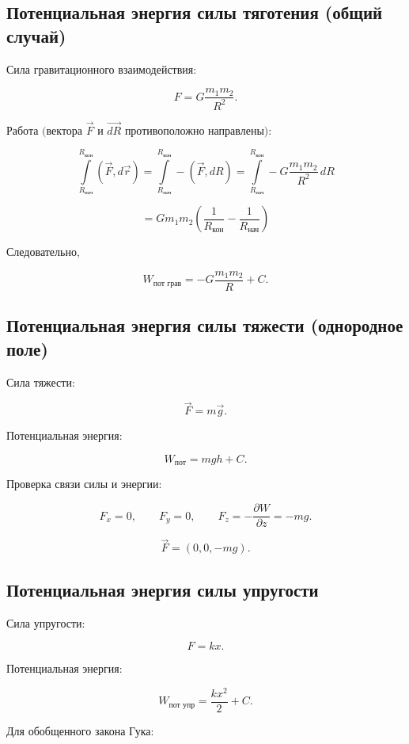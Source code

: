\documentclass[a4paper,12pt]{article}
\begin{document}
\subsection*{Потенциальная энергия силы тяготения (общий случай)}

Сила гравитационного взаимодействия:

\[
F = G \frac{m_1 m_2}{R^2}.
\]

$\text{Работа (вектора } \vec{F} \text{ и } \vec{dR} \text{ противоположно направлены):}$

\[
\int\limits_{R_{\text{нач}}}^{R_{\text{кон}}} (\vec F, d\vec r)
=
\int\limits_{R_{\text{нач}}}^{R_{\text{кон}}} - (\vec F, dR)
=
\int\limits_{R_{\text{нач}}}^{R_{\text{кон}}} - G \frac{m_1 m_2}{R^2}\, dR
\]

\[
=
G m_1 m_2
\left(
\frac{1}{R_{\text{кон}}}
-
\frac{1}{R_{\text{нач}}}
\right)
\]

Следовательно,

\[
W_{\text{пот грав}}
=
-
G \frac{m_1 m_2}{R}
+
C.
\]

\vspace{0.8em}

\subsection*{Потенциальная энергия силы тяжести (однородное поле)}

Сила тяжести:

\[
\vec F = m\vec g.
\]

Потенциальная энергия:

\[
W_{\text{пот}} = mgh + C.
\]

Проверка связи силы и энергии:

\[
F_x = 0,
\qquad
F_y = 0,
\qquad
F_z = -\frac{\partial W}{\partial z} = -mg.
\]

\[
\vec F = (0,0,-mg).
\]

\vspace{0.8em}

\subsection*{Потенциальная энергия силы упругости}

Сила упругости:

\[
F = kx.
\]

Потенциальная энергия:

\[
W_{\text{пот упр}} = \frac{kx^2}{2} + C.
\]

Для обобщенного закона Гука:
\end{document}
